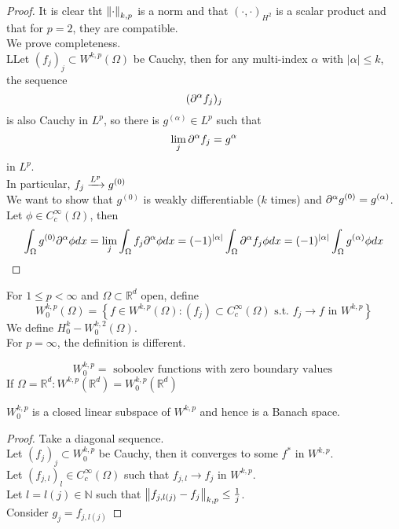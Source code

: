 \documentclass[../main.tex]{subfiles}
\begin{document}
\begin{proof}
	It is clear tht $\left\lVert\cdot\right\rVert_{k,p} $ is a norm and that $( \cdot,\cdot) _{H^{2}} $ is a scalar product and that for $p=2$, they are compatible.\\
	We prove completeness.\\
	LLet $( f_j)_j \subset W^{k,p}( \Omega) $ be Cauchy, then for any multi-index $\alpha$ with $|\alpha| \leq k$, the sequence
	\[ 
		( \partial^{\alpha}f_j)_j 
	\]
	is also Cauchy in $L^{p}$, so there is $g^{( \alpha) }\in L^{p}$ such that 
	\[ 
	\lim_j \partial^{\alpha} f_j = g^{\alpha}
	\]
	in $L^{p}$.\\
	In particular, $f_j \xrightarrow{L^{p}} g^{( 0) }$ \\
	We want to show that $g^{( 0) }$ is weakly differentiable ($k$ times) and $\partial^{\alpha}g^{( 0) }= g^{( \alpha) }$.\\
	Let $\phi \in C^{ \infty }_c( \Omega) $, then
	\[ 
	\int_{ \Omega }^{  } g^{( 0) }\partial^{\alpha}\phi dx = \lim_j \int_{ \Omega }^{  }f_j \partial^{\alpha}\phi dx = ( -1) ^{|\alpha|} \int_{ \Omega }^{  } \partial^{\alpha}f_j \phi dx = ( -1) ^{|\alpha|} \int_{ \Omega }^{  } g^{( \alpha) }\phi dx
	\]
\end{proof}
\begin{defn}
	For $1 \leq p < \infty $ and $\Omega \subset \mathbb{R}^{d}$ open, define 
	\[ 
	W^{k,p}_0( \Omega)  = \left\{ f \in W^{k,p}( \Omega) : ( f_j) \subset C^{ \infty }_c( \Omega) \text{ s.t. } f_j \to f \text{ in } W^{k,p}  \right\} 
	\]
	We define $H^{k}_0- W^{k,2}_0 ( \Omega) $.\\
	For $p= \infty $, the definition is different.

\end{defn}
\begin{rmq}
\[ 
W^{k,p}_0 = \text{ soboolev functions with zero boundary values } 
\]
If $\Omega= \mathbb{R}^{d}: W^{k,p}( \mathbb{R}^{d}) = W^{k,p}_0( \mathbb{R}^{d}) $ 
\end{rmq}
\begin{lemma}
$W^{k,p}_0$ is a closed linear subspace of $W^{k,p}$ and hence is a Banach space.
\end{lemma}
\begin{proof}
Take a diagonal sequence.\\
Let $( f_j)_j \subset W^{k,p}_0$ be Cauchy, then it converges to some $f^{\ast}$ in $W^{k,p}$.\\
Let $( f_{j,l} )_l \in C^{ \infty }_c ( \Omega) $ such that $f_{j,l} \to f_j$ in $W^{k,p}$.\\
Let $l= l( j) \in \mathbb{N}$ such that $ \left\lVert f_{j,l( j)} - f_j\right\rVert_{k,p} \leq  \frac{1}{j}$.\\
Consider $g_j = f_{j,l( j) }  $ 
\end{proof}
\end{document}
